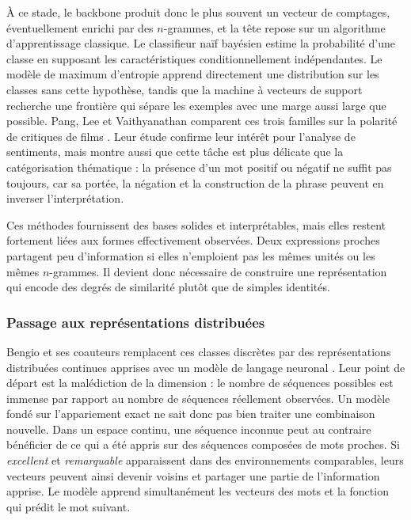 À ce stade, le backbone produit donc le plus souvent un vecteur de comptages,
éventuellement enrichi par des $n$-grammes, et la tête repose sur un algorithme
d'apprentissage classique. Le classifieur naïf bayésien estime la probabilité
d'une classe en supposant les caractéristiques conditionnellement
indépendantes. Le modèle de maximum d'entropie apprend directement une
distribution sur les classes sans cette hypothèse, tandis que la machine à
vecteurs de support recherche une frontière qui sépare les exemples avec une
marge aussi large que possible. Pang, Lee et Vaithyanathan comparent ces trois
familles sur la polarité de critiques de films
\cite{pang2002sentiment}. Leur étude confirme leur intérêt pour l'analyse de
sentiments, mais montre aussi que cette tâche est plus délicate que la
catégorisation thématique : la présence d'un mot positif ou négatif ne suffit
pas toujours, car sa portée, la négation et la construction de la phrase peuvent
en inverser l'interprétation.

Ces méthodes fournissent des bases solides et interprétables, mais elles restent
fortement liées aux formes effectivement observées. Deux expressions proches
partagent peu d'information si elles n'emploient pas les mêmes unités ou les
mêmes $n$-grammes. Il devient donc nécessaire de construire une représentation
qui encode des degrés de similarité plutôt que de simples identités.

\subsubsection{Passage aux représentations distribuées}

Bengio et ses coauteurs remplacent ces classes discrètes par des
représentations distribuées continues apprises avec un modèle de langage
neuronal \cite{bengio2003neural}. Leur point de départ est la malédiction de la
dimension : le nombre de séquences possibles est immense par rapport au nombre
de séquences réellement observées. Un modèle fondé sur l'appariement exact ne
sait donc pas bien traiter une combinaison nouvelle. Dans un espace continu,
une séquence inconnue peut au contraire bénéficier de ce qui a été appris sur
des séquences composées de mots proches. Si \emph{excellent} et
\emph{remarquable} apparaissent dans des environnements comparables, leurs
vecteurs peuvent ainsi devenir voisins et partager une partie de l'information
apprise. Le modèle apprend simultanément les vecteurs des mots et la fonction
qui prédit le mot suivant.

